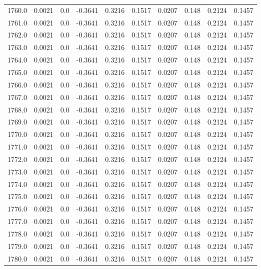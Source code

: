 \begin{longtable}{lrrrrrrrrr}
1760.0 & 0.0021 & 0.0 & -0.3641 & 0.3216 & 0.1517 & 0.0207 & 0.148 & 0.2124 & 0.1457 \\
1761.0 & 0.0021 & 0.0 & -0.3641 & 0.3216 & 0.1517 & 0.0207 & 0.148 & 0.2124 & 0.1457 \\
1762.0 & 0.0021 & 0.0 & -0.3641 & 0.3216 & 0.1517 & 0.0207 & 0.148 & 0.2124 & 0.1457 \\
1763.0 & 0.0021 & 0.0 & -0.3641 & 0.3216 & 0.1517 & 0.0207 & 0.148 & 0.2124 & 0.1457 \\
1764.0 & 0.0021 & 0.0 & -0.3641 & 0.3216 & 0.1517 & 0.0207 & 0.148 & 0.2124 & 0.1457 \\
1765.0 & 0.0021 & 0.0 & -0.3641 & 0.3216 & 0.1517 & 0.0207 & 0.148 & 0.2124 & 0.1457 \\
1766.0 & 0.0021 & 0.0 & -0.3641 & 0.3216 & 0.1517 & 0.0207 & 0.148 & 0.2124 & 0.1457 \\
1767.0 & 0.0021 & 0.0 & -0.3641 & 0.3216 & 0.1517 & 0.0207 & 0.148 & 0.2124 & 0.1457 \\
1768.0 & 0.0021 & 0.0 & -0.3641 & 0.3216 & 0.1517 & 0.0207 & 0.148 & 0.2124 & 0.1457 \\
1769.0 & 0.0021 & 0.0 & -0.3641 & 0.3216 & 0.1517 & 0.0207 & 0.148 & 0.2124 & 0.1457 \\
1770.0 & 0.0021 & 0.0 & -0.3641 & 0.3216 & 0.1517 & 0.0207 & 0.148 & 0.2124 & 0.1457 \\
1771.0 & 0.0021 & 0.0 & -0.3641 & 0.3216 & 0.1517 & 0.0207 & 0.148 & 0.2124 & 0.1457 \\
1772.0 & 0.0021 & 0.0 & -0.3641 & 0.3216 & 0.1517 & 0.0207 & 0.148 & 0.2124 & 0.1457 \\
1773.0 & 0.0021 & 0.0 & -0.3641 & 0.3216 & 0.1517 & 0.0207 & 0.148 & 0.2124 & 0.1457 \\
1774.0 & 0.0021 & 0.0 & -0.3641 & 0.3216 & 0.1517 & 0.0207 & 0.148 & 0.2124 & 0.1457 \\
1775.0 & 0.0021 & 0.0 & -0.3641 & 0.3216 & 0.1517 & 0.0207 & 0.148 & 0.2124 & 0.1457 \\
1776.0 & 0.0021 & 0.0 & -0.3641 & 0.3216 & 0.1517 & 0.0207 & 0.148 & 0.2124 & 0.1457 \\
1777.0 & 0.0021 & 0.0 & -0.3641 & 0.3216 & 0.1517 & 0.0207 & 0.148 & 0.2124 & 0.1457 \\
1778.0 & 0.0021 & 0.0 & -0.3641 & 0.3216 & 0.1517 & 0.0207 & 0.148 & 0.2124 & 0.1457 \\
1779.0 & 0.0021 & 0.0 & -0.3641 & 0.3216 & 0.1517 & 0.0207 & 0.148 & 0.2124 & 0.1457 \\
1780.0 & 0.0021 & 0.0 & -0.3641 & 0.3216 & 0.1517 & 0.0207 & 0.148 & 0.2124 & 0.1457 \\

\end{longtable}
